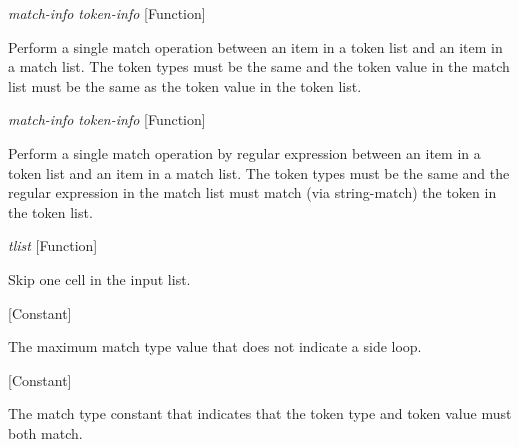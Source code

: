 \vspace{1em}
\noindent
{}
\usebox{\funcname}\emph{match-info} \emph{token-info}
 \hfill [Function]

\begin{doc-string}
Perform a single match operation between an item in a token list and an item
in a match list.  The token types must be the same and the token value in the
match list must be the same as the token value in the token list.
\end{doc-string}

\vspace{1em}
\noindent
{}
\usebox{\funcname}\emph{match-info} \emph{token-info}
 \hfill [Function]

\begin{doc-string}
Perform a single match operation by regular expression between an
item in a token list and an item in a match list.  The token types
must be the same and the regular expression in the match list must
match (via string-match) the token in the token list.
\end{doc-string}

\vspace{1em}
\noindent
{}
\usebox{\funcname}\emph{tlist}
 \hfill [Function]

\begin{doc-string}
Skip one cell in the input list.
\end{doc-string}

\vspace{1em}
\noindent
{}
\usebox{\funcname}
 \hfill [Constant]

\begin{doc-string}
The maximum match type value that does not indicate a side loop.
\end{doc-string}

\vspace{1em}
\noindent
{}
\usebox{\funcname}
 \hfill [Constant]

\begin{doc-string}
The match type constant that indicates that the token type and token value
must both match.
\end{doc-string}

